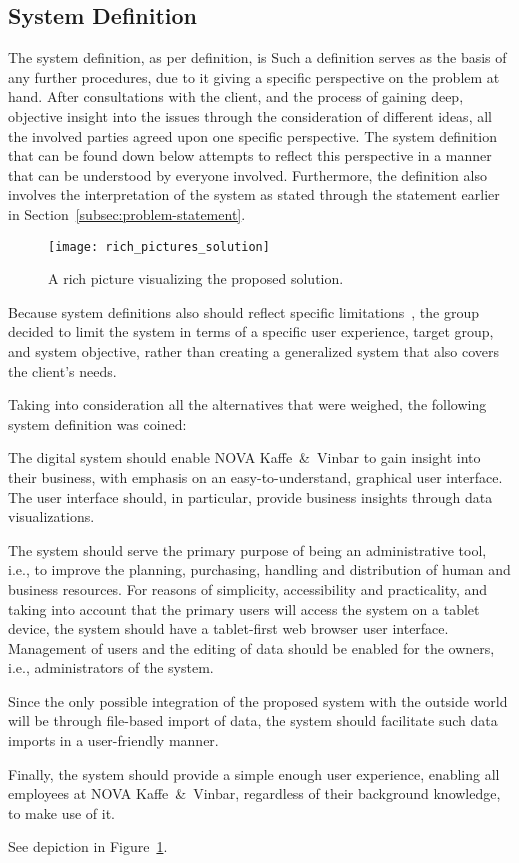 \subsection{System Definition}\label{subsec:system-definition}

The system definition, as per definition, is
Such a definition serves as the basis of any further procedures, due to it giving a specific perspective on the problem
at hand.
After consultations with the client, and the process of gaining deep, objective insight into the issues through the
consideration of different ideas, all the involved parties agreed upon one specific perspective.
The system definition that can be found down below attempts to reflect this perspective in a manner that can be
understood by everyone involved.
Furthermore, the definition also involves the interpretation of the system as stated through the statement earlier in
Section~\ref{subsec:problem-statement}.

\begin{figure}[H]
    \centering
    \texttt{[image: rich\_pictures\_solution]}
    \caption{A rich picture visualizing the proposed solution.
    }\label{fig:pda-solution}
\end{figure}

Because system definitions also should reflect specific limitations~\cite[38]{mathiassen2018}, the group decided to
limit the system in terms of a specific user experience, target group, and system objective, rather than creating a
generalized system that also covers the client's needs.

Taking into consideration all the alternatives that were weighed, the following system definition was coined:

\begin{tcolorbox}[title=System definition]
    The digital system should enable NOVA Kaffe~\&~Vinbar to gain insight into their business, with emphasis on an
    easy-to-understand, graphical user interface.
    The user interface should, in particular, provide business insights through data visualizations.

    The system should serve the primary purpose of being an administrative tool, i.e., to improve the planning,
    purchasing, handling and distribution of human and business resources.
    For reasons of simplicity, accessibility and practicality, and taking into account that the primary users will
    access the system on a tablet device, the system should have a tablet-first web browser user interface.
    Management of users and the editing of data should be enabled for the owners, i.e., administrators of the system.

    Since the only possible integration of the proposed system with the outside world will be through file-based import
    of data, the system should facilitate such data imports in a user-friendly manner.

    Finally, the system should provide a simple enough user experience, enabling all employees at NOVA Kaffe~\&~Vinbar,
    regardless of their background knowledge, to make use of it.
\end{tcolorbox}

See depiction in Figure~\ref{fig:pda-solution}.
